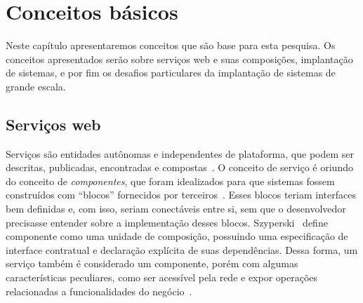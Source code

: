 \chapter{Conceitos básicos}
\label{cap:conceitos}

Neste capítulo apresentaremos conceitos que são base para esta pesquisa.
Os conceitos apresentados serão sobre serviços web e suas composições, 
implantação de sistemas, e por fim os desafios particulares da implantação
de sistemas de grande escala.


\section{Serviços web}
\label{sec:servicos}


Serviços são entidades autônomas e independentes de plataforma, que podem ser descritas, publicadas, encontradas e compostas~\cite{Papazoglou2007State}. O conceito de serviço é oriundo do conceito de \emph{componentes}, que foram idealizados para que sistemas fossem construídos com ``blocos'' fornecidos por terceiros~\cite{McIlroy1968MassProduced}. Esses blocos teriam interfaces bem definidas e, com isso, seriam conectáveis entre si, sem que o desenvolvedor precisasse entender sobre a implementação desses blocos. Szyperski~\cite{Szyperski2003Component} define componente como uma unidade de composição, possuindo uma especificação de interface contratual e declaração explícita de suas dependências. Dessa forma, um serviço também é considerado um componente, porém com algumas características peculiares, como ser acessível pela rede e expor operações relacionadas a funcionalidades do negócio~\cite{Hewitt2009JavaSOA}. 


